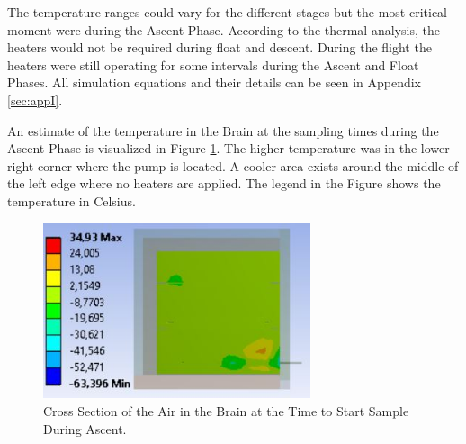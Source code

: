 The temperature ranges could vary for the different stages but the most critical moment were during the Ascent Phase. 
According to the thermal analysis, the heaters would not be required during float and descent. During the flight the heaters were still operating for some intervals during the Ascent and Float Phases. %
All simulation equations and their details can be seen in Appendix \ref{sec:appI}. 

An estimate of the temperature in the Brain at the sampling times during the Ascent Phase is visualized in Figure \ref{fig:Air-in-brain-4-6}. The higher temperature was in the lower right corner where the pump is located. A cooler area exists around the middle of the left edge where no heaters are applied. The legend in the Figure shows the temperature in Celsius.

\begin{figure}[H]
    \centering
    \includegraphics[width=0.7\textwidth]{4-experiment-design/img/Thermal/air-sampling-with-box}
    \caption{Cross Section of the Air in the Brain at the Time to Start Sample During Ascent.}
    \label{fig:Air-in-brain-4-6}
\end{figure}

